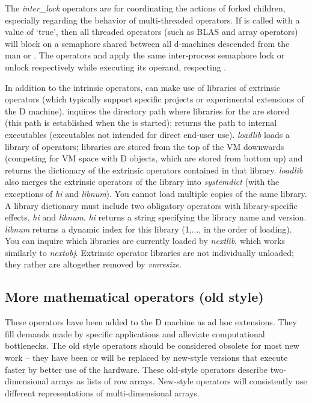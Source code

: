 The \emph{inter\_lock} operators are for coordinating the actions of
forked children, especially regarding the behavior of multi-threaded
operators. If  is called with a value of `true',
then all threaded operators (such as BLAS and array operators) will
block on a semaphore shared between all d-machines descended from the
man  or . The operators  and
apply the same inter-process semaphore lock or unlock
respectively while executing its operand, respecting
.

In addition to the intrinsic operators,  can make
use of libraries of extrinsic operators (which typically support
specific projects or experimental extensions of the D
machine).  inquires the directory path where
libraries for the  are stored (this path is established
when the  is started);  returns the path
to internal executables (executables not intended for direct end-user
use). \emph{loadlib} loads a library of operators; libraries are
stored from the top of the VM downwards (competing for VM space with D
objects, which are stored from bottom up) and returns the dictionary
of the extrinsic operators contained in that library. \emph{loadlib}
also merges the extrinsic operators of the library into
\emph{systemdict} (with the exceptions of \emph{hi} and
\emph{libnum}). You cannot load multiple copies of the same library. A
library dictionary must include two obligatory operators with
library-specific effects, \emph{hi} and \emph{libnum}. \emph{hi}
returns a string specifying the library name and
version. \emph{libnum} returns a dynamic index for this library
(1,..., in the order of loading). You can inquire which libraries are
currently loaded by \emph{nextlib}, which works similarly to
\emph{nextobj}. Extrinsic operator libraries are not individually
unloaded; they rather are altogether removed by \emph{vmresize}.


\subsection{More mathematical operators (old style)}\label{ssec:oldstyle}

These operators have been added to the D machine as ad hoc extensions. They fill demands made by specific applications and alleviate computational bottlenecks. The old style operators should be considered obsolete for most new work -- they have been or will be replaced by new-style versions that execute faster by better use of the hardware. These old-style operators describe two-dimensional arrays as lists of row arrays. New-style operators will consistently use different representations of multi-dimensional arrays.\\


